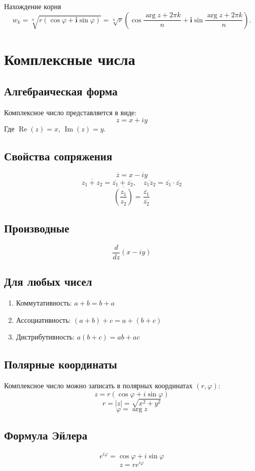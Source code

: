 \documentclass{article}
\begin{document}
Нахождение корня
\[
    w_k=\sqrt[n]{r(\cos\varphi+\mathbf i \sin\varphi)}=\!\sqrt[n]{r}\left(\cos
\frac{\arg z+2\pi k}n+\mathbf i \sin\frac{\arg z+2\pi k}n\right).
\]



\section{Комплексные числа}

\subsection{Алгебраическая форма}
Комплексное число представляется в виде:
\[
z = x + iy
\]
Где $\operatorname{Re}(z) = x$, $\operatorname{Im}(z) = y$.

\subsection{Свойства сопряжения}
\[
\overline{z} = x - iy
\]
\[
\overline{z_1 + z_2} = \overline{z_1} + \overline{z_2}, \quad \overline{z_1 z_2} = \overline{z_1} \cdot \overline{z_2}
\]
\[
\overline{\left(\frac{z_1}{z_2}\right)} = \frac{\overline{z_1}}{\overline{z_2}}
\]

\subsection{Производные}
\[
\frac{d}{dz} (x - iy)
\]

\subsection{Для любых чисел}
\begin{enumerate}
    \item Коммутативность: \( a + b = b + a \)
    \item Ассоциативность: \( (a + b) + c = a + (b + c) \)
    \item Дистрибутивность: \( a (b + c) = ab + ac \)
\end{enumerate}

\subsection{Полярные координаты}
Комплексное число можно записать в полярных координатах $(r, \varphi)$:
\[
z = r (\cos \varphi + i \sin \varphi)
\]
\[
r = |z| = \sqrt{x^2 + y^2}
\]
\[
\varphi = \arg z
\]

\subsection{Формула Эйлера}
\[
e^{i \varphi} = \cos \varphi + i \sin \varphi
\]
\[
z = r e^{i\varphi}
\]
\end{document}
